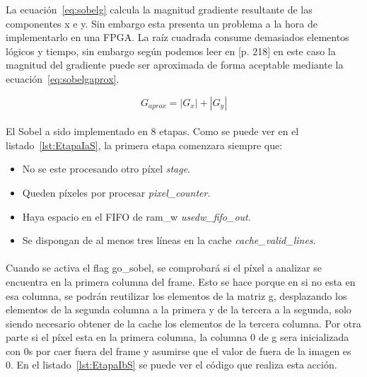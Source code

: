 \documentclass[a4paper,12pt,titlepage,final]{book}
\begin{document}
La ecuación~\ref{eq:sobelg} calcula la magnitud gradiente resultante de las componentes x e y. Sin embargo esta presenta un problema a la hora de implementarlo en una FPGA. La raíz cuadrada consume demasiados elementos lógicos y tiempo, sin embargo según podemos leer en [p. 218] \citet{Myler} en este caso la magnitud del gradiente puede ser aproximada de forma aceptable mediante la ecuación~\ref{eq:sobelgaprox}.

\begin{equation}\label{eq:sobelgaprox}
G_{aprox}=|G_x| + |G_y|
\end{equation}

\paragraph{}
El Sobel a sido implementado en 8 etapas. Como se puede ver en el listado~\ref{lst:EtapaIaS}, la primera etapa comenzara siempre que:

\begin{itemize}
 \item No se este procesando otro píxel \textit{stage}.
 \item Queden píxeles por procesar \textit{pixel\_counter}.
 \item Haya espacio en el FIFO de ram\_w \textit{usedw\_fifo\_out}.
 \item Se dispongan de al menos tres líneas en la cache \textit{cache\_valid\_lines}.
\end{itemize}



\paragraph{}
Cuando se activa el flag go\_sobel, se comprobará si el píxel a analizar se encuentra en la primera columna del frame. Esto se hace porque en si no esta en esa columna, se podrán reutilizar los elementos de la matriz g, desplazando los elementos de la segunda columna a la primera y de la tercera a la segunda, solo siendo necesario obtener de la cache los elementos de la tercera columna. Por otra parte si el píxel esta en la primera columna, la columna 0 de g sera inicializada con 0s por caer fuera del frame y asumirse que el valor de fuera de la imagen es 0. En el listado~\ref{lst:EtapaIbS} se puede ver el código que realiza esta acción.


\end{document}
